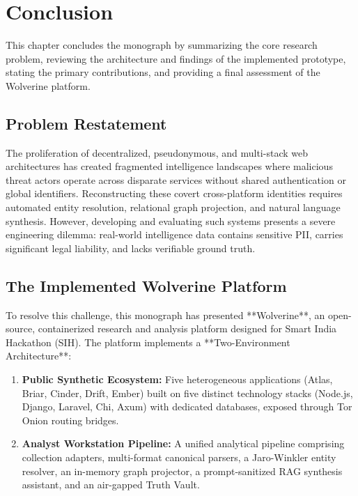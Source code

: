 \chapter{Conclusion}
\label{ch:conclusion}

This chapter concludes the monograph by summarizing the core research problem, reviewing the architecture and findings of the implemented prototype, stating the primary contributions, and providing a final assessment of the Wolverine platform.

\section{Problem Restatement}
\label{sec:concl-problem}
The proliferation of decentralized, pseudonymous, and multi-stack web architectures has created fragmented intelligence landscapes where malicious threat actors operate across disparate services without shared authentication or global identifiers. Reconstructing these covert cross-platform identities requires automated entity resolution, relational graph projection, and natural language synthesis. However, developing and evaluating such systems presents a severe engineering dilemma: real-world intelligence data contains sensitive PII, carries significant legal liability, and lacks verifiable ground truth.

\section{The Implemented Wolverine Platform}
\label{sec:concl-system}
To resolve this challenge, this monograph has presented **Wolverine**, an open-source, containerized research and analysis platform designed for Smart India Hackathon (SIH). The platform implements a **Two-Environment Architecture**:
\begin{enumerate}
    \item \textbf{Public Synthetic Ecosystem:} Five heterogeneous applications (Atlas, Briar, Cinder, Drift, Ember) built on five distinct technology stacks (Node.js, Django, Laravel, Chi, Axum) with dedicated databases, exposed through Tor Onion routing bridges.
    \item \textbf{Analyst Workstation Pipeline:} A unified analytical pipeline comprising collection adapters, multi-format canonical parsers, a Jaro-Winkler entity resolver, an in-memory graph projector, a prompt-sanitized RAG synthesis assistant, and an air-gapped Truth Vault.
\end{enumerate}

